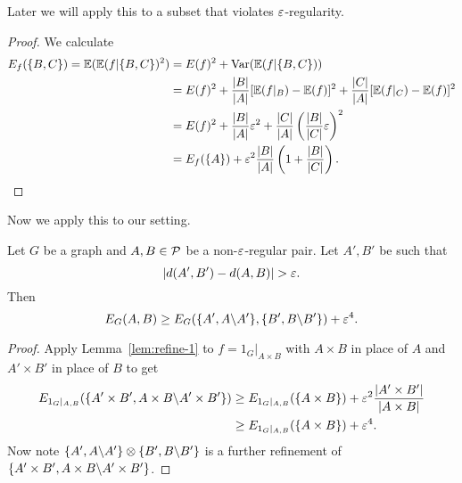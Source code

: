Later we will apply this to a subset that violates $\ep$-regularity.
\begin{proof}
We calculate
\begin{align*}
E_f(\{B,C\})=\E(\E(f|\{B,C\})^2)
&=E(f)^2+\Var(\E(f|\{B,C\}))\\
&=E(f)^2+\fc{|B|}{|A|}[\E(f|_{B})-\E(f)]^2+\fc{|C|}{|A|}[\E(f|_{C})-\E(f)]^2\\
&=E(f)^2+\fc{|B|}{|A|}\ep^2+\fc{|C|}{|A|}\pa{\fc{|B|}{|C|}\ep}^2\\
&=E_f(\{A\})+\ep^2\fc{|B|}{|A|}\pa{1+\fc{|B|}{|C|}}.
\end{align*}
\end{proof}
Now we apply this to our setting.
\begin{lem}
Let $G$ be a graph %
and $A,B\in \cal P$ be a non-$\ep$-regular pair.
Let $A',B'$ be such that 
\[
|d(A',B')-d(A,B)|>\ep.
\]
Then
\[
E_G(A,B)\ge E_{G}(\{A',A\bs A'\},\{B',B\bs B'\})+\ep^4.%
\]
\end{lem}
\begin{proof}
Apply Lemma~\ref{lem:refine-1} to $f=1_G|_{A\times B}$ with $A\times B$ in place of $A$ and $A'\times B'$ in place of $B$ to get
\begin{align*}
E_{1_G|_{A,B}}(\{A'\times B',A\times B\bs A'\times B'\})
&\ge E_{1_G|_{A,B}}(\{A\times B\}) +\ep^2\fc{|A'\times B'|}{|A\times B|}\\
&\ge E_{1_G|_{A,B}}(\{A\times B\}) +\ep^4.
\end{align*}
Now note $\{A',A\bs A'\}\otimes\{B',B\bs B'\}$ is a further refinement of $\{A'\times B',A\times B\bs A'\times B'\}$.
\end{proof}
